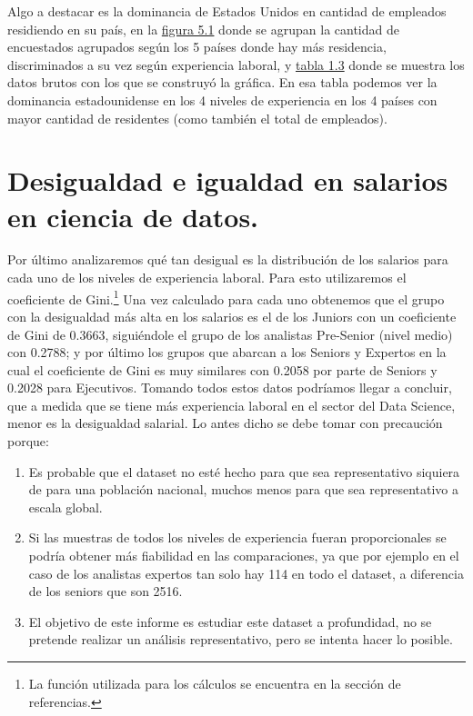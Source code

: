 \documentclass{article}
\begin{document}
Algo a destacar es la dominancia de Estados Unidos en cantidad de empleados residiendo en su país, en la \hyperref[figura 5.1 grafico de barras agrupado]{figura 5.1} donde se agrupan la cantidad de encuestados agrupados según los 5 países donde hay más residencia, discriminados a su vez según experiencia laboral, y \hyperref[tabla 1.3]{tabla 1.3} donde se muestra los datos brutos con los que se construyó la gráfica. En esa tabla podemos ver la dominancia estadounidense en los 4 niveles de experiencia en los 4 países con mayor cantidad de residentes (como también el total de empleados).
	\section{Desigualdad e igualdad en salarios en ciencia de datos.}
	Por último analizaremos qué tan desigual es la distribución de los salarios para cada uno de los niveles de experiencia laboral. Para esto utilizaremos el coeficiente de Gini.\footnote{La función utilizada para los cálculos se encuentra en la sección de referencias.}
	Una vez calculado para cada uno obtenemos que el grupo con la desigualdad más alta en los salarios es el de los Juniors con un coeficiente de Gini de 0.3663, siguiéndole el grupo de los analistas Pre-Senior (nivel medio) con 0.2788; y por último los grupos que abarcan a los Seniors y Expertos en la cual el coeficiente de Gini es muy similares con 0.2058 por parte de Seniors y 0.2028 para Ejecutivos. Tomando todos estos datos podríamos llegar a concluir, que a medida que se tiene más experiencia laboral en el sector del Data Science, menor es la desigualdad salarial. Lo antes dicho se debe tomar con  precaución porque:
	\begin{enumerate}
		\item Es probable que el dataset no esté hecho para que sea representativo siquiera de para una población nacional, muchos menos para que sea representativo a escala global.
		\item Si las muestras de todos los niveles de experiencia fueran proporcionales se podría obtener más fiabilidad en las comparaciones, ya que por ejemplo en el caso de los analistas expertos tan solo hay 114 en todo el dataset, a diferencia de los seniors que son 2516.
		\item El objetivo de este informe es estudiar este dataset a profundidad, no se pretende realizar un análisis representativo, pero se intenta hacer lo posible.
	\end{enumerate}
\end{document}
